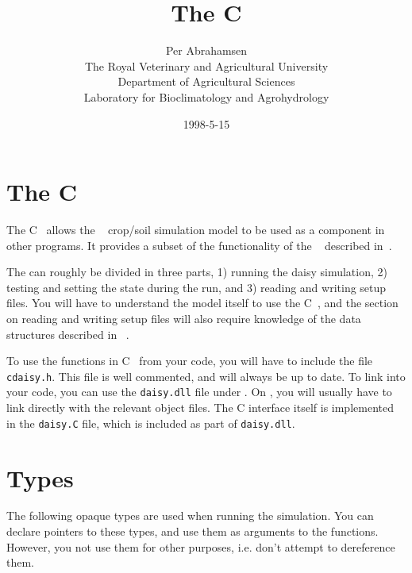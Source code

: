 \documentclass[a4paper,10pt,titlepage]{article}
\begin{document}
\title{The \Daisy{} C \Api{}}
\author{Per Abrahamsen\\
The Royal Veterinary and Agricultural University\\
Department of Agricultural Sciences\\
Laboratory for Bioclimatology and Agrohydrology}
\date{1998-5-15}
\maketitle

\section*{The \Daisy{} C \Api{}}

The C~\Api{} allows the \daisy{}~\cite{daisy-def} crop/soil
simulation model to be used as a component in other programs.  It
provides a subset of the functionality of the \cplusplus{}~\api{}
described in~\cite{daisy-guide}.

The \api{} can roughly be divided in three parts, 1) running the daisy
simulation, 2) testing and setting the state during the run, and 3)
reading and writing \daisy{} setup files.  You will have to understand
the \daisy{} model itself to use the C~\api{}, and the section on
reading and writing setup files will also require knowledge of the
\cplusplus{} data structures described in ~\cite{daisy-guide}.

To use the functions in C~\api{} from your code, you will have to
include the file \texttt{cdaisy.h}.  This file is well commented, and
will always be up to date.  To link \daisy{} into your code, you can
use the \texttt{daisy.dll} file under \wintel{}.  On \unix{}, you will
usually have to link directly with the relevant object files.  The C
interface itself is implemented in the \texttt{daisy.C} file, which is
included as part of \texttt{daisy.dll}.

\section{Types}

The following opaque types are used when running the simulation.  You
can declare pointers to these types, and use them as arguments to the
\api{} functions.  However, you not use them for other purposes,
i.e. don't attempt to dereference them.
\end{document}
